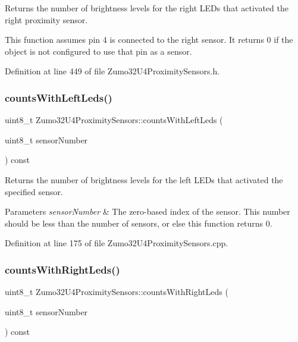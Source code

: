 Returns the number of brightness levels for the right L\+E\+Ds that activated the right proximity sensor. 

This function assumes pin 4 is connected to the right sensor. It returns 0 if the object is not configured to use that pin as a sensor. 

Definition at line 449 of file Zumo32\+U4\+Proximity\+Sensors.\+h.

\mbox{\label{class_zumo32_u4_proximity_sensors_a734abb888814a97379c349e1deb8897f}} 
\subsubsection{\texorpdfstring{counts\+With\+Left\+Leds()}{countsWithLeftLeds()}}
{\footnotesize\ttfamily uint8\+\_\+t Zumo32\+U4\+Proximity\+Sensors\+::counts\+With\+Left\+Leds (\begin{DoxyParamCaption}\item[{uint8\+\_\+t}]{sensor\+Number }\end{DoxyParamCaption}) const}



Returns the number of brightness levels for the left L\+E\+Ds that activated the specified sensor. 


\begin{DoxyParams}{Parameters}
{\em sensor\+Number} & The zero-\/based index of the sensor. This number should be less than the number of sensors, or else this function returns 0. \\
\hline
\end{DoxyParams}


Definition at line 175 of file Zumo32\+U4\+Proximity\+Sensors.\+cpp.

\mbox{\label{class_zumo32_u4_proximity_sensors_a2789f740828a81fe3c942998639355ae}} 
\subsubsection{\texorpdfstring{counts\+With\+Right\+Leds()}{countsWithRightLeds()}}
{\footnotesize\ttfamily uint8\+\_\+t Zumo32\+U4\+Proximity\+Sensors\+::counts\+With\+Right\+Leds (\begin{DoxyParamCaption}\item[{uint8\+\_\+t}]{sensor\+Number }\end{DoxyParamCaption}) const}



